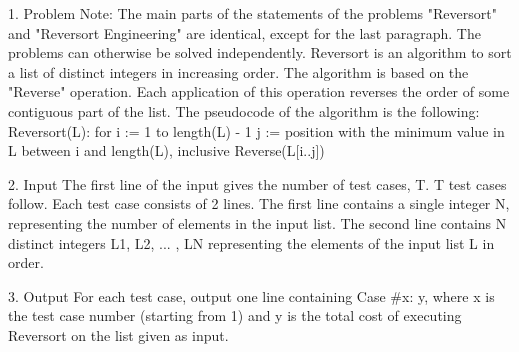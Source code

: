 1. Problem
Note: The main parts of the statements of the problems "Reversort" and "Reversort Engineering" are identical, except for the last paragraph. The problems can otherwise be solved independently.
Reversort is an algorithm to sort a list of distinct integers in increasing order. The algorithm is based on the "Reverse" operation. Each application of this operation reverses the order of some contiguous part of the list.
The pseudocode of the algorithm is the following:
Reversort(L):
  for i := 1 to length(L) - 1
    j := position with the minimum value in L between i and length(L), inclusive
    Reverse(L[i..j])

2. Input
The first line of the input gives the number of test cases, T.
T test cases follow. Each test case consists of 2 lines.
The first line contains a single integer N, representing the number of elements in the input list.
The second line contains N distinct integers L1, L2, ... , LN representing
the elements of the input list L in order.

3. Output
For each test case, output one line containing Case #x: y, where x is
the test case number (starting from 1) and y is the total cost of executing
Reversort on the list given as input.
